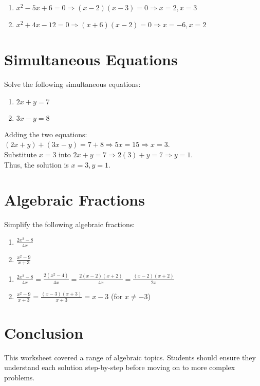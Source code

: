 \documentclass[a4paper,12pt]{article}
\begin{document}
\begin{solution}
\begin{enumerate}
    \item \( x^2 - 5x + 6 = 0 \Rightarrow (x - 2)(x - 3) = 0 \Rightarrow x = 2, x = 3 \)
    \item \( x^2 + 4x - 12 = 0 \Rightarrow (x + 6)(x - 2) = 0 \Rightarrow x = -6, x = 2 \)
\end{enumerate}
\end{solution}

\section{Simultaneous Equations}
\begin{question}
Solve the following simultaneous equations:
\begin{enumerate}
    \item \( 2x + y = 7 \)
    \item \( 3x - y = 8 \)
\end{enumerate}
\end{question}

\begin{solution}
Adding the two equations: \\
\( (2x + y) + (3x - y) = 7 + 8 \Rightarrow 5x = 15 \Rightarrow x = 3 \).\\
Substitute \( x = 3 \) into \( 2x + y = 7 \Rightarrow 2(3) + y = 7 \Rightarrow y = 1 \).\\
Thus, the solution is \( x = 3, y = 1 \).
\end{solution}

\section{Algebraic Fractions}
\begin{question}
Simplify the following algebraic fractions:
\begin{enumerate}
    \item \( \frac{2x^2 - 8}{4x} \)
    \item \( \frac{x^2 - 9}{x + 3} \)
\end{enumerate}
\end{question}

\begin{solution}
\begin{enumerate}
    \item \( \frac{2x^2 - 8}{4x} = \frac{2(x^2 - 4)}{4x} = \frac{2(x - 2)(x + 2)}{4x} = \frac{(x - 2)(x + 2)}{2x} \)
    \item \( \frac{x^2 - 9}{x + 3} = \frac{(x - 3)(x + 3)}{x + 3} = x - 3 \) (for \( x \neq -3 \))
\end{enumerate}
\end{solution}

\section*{Conclusion}
This worksheet covered a range of algebraic topics. Students should ensure they understand each solution step-by-step before moving on to more complex problems.
\end{document}
